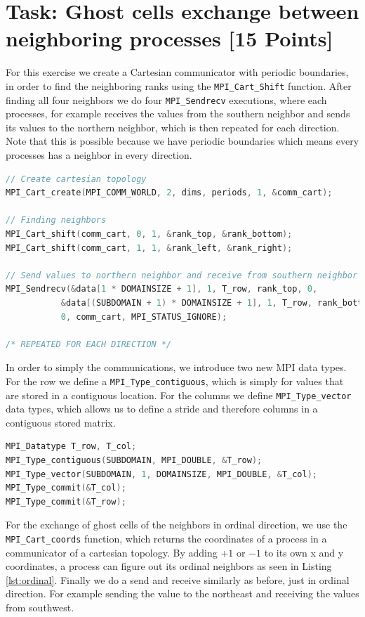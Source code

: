 \section{Task: Ghost cells exchange between neighboring processes [15 Points]}
For this exercise we create a Cartesian communicator with periodic boundaries, in order to find the neighboring ranks using the \texttt{MPI\_Cart\_Shift} function.
After finding all four neighbors we do four \texttt{MPI\_Sendrecv} executions, where each processes, for example receives the values from the southern neighbor and sends its values to the northern neighbor, which is then repeated for each direction. Note that this is possible because we have periodic boundaries which means every processes has a neighbor in every direction.
\begin{lstlisting}[language=C++, caption=Example, label=lst:sendrc]
// Create cartesian topology
MPI_Cart_create(MPI_COMM_WORLD, 2, dims, periods, 1, &comm_cart);

// Finding neighbors
MPI_Cart_shift(comm_cart, 0, 1, &rank_top, &rank_bottom);
MPI_Cart_shift(comm_cart, 1, 1, &rank_left, &rank_right);

// Send values to northern neighbor and receive from southern neighbor
MPI_Sendrecv(&data[1 * DOMAINSIZE + 1], 1, T_row, rank_top, 0,
		   &data[(SUBDOMAIN + 1) * DOMAINSIZE + 1], 1, T_row, rank_bottom,
		   0, comm_cart, MPI_STATUS_IGNORE);

/* REPEATED FOR EACH DIRECTION */
\end{lstlisting}
In order to simply the communications, we introduce two new MPI data types. For the row we define a \texttt{MPI\_Type\_contiguous}, which is simply for values that are stored in a contiguous location. For the columns we define \texttt{MPI\_Type\_vector} data types, which allows us to define a stride and therefore columns in a contiguous stored matrix.
\begin{lstlisting}[language=C++, caption=Example, label=lst:mpi_type]
MPI_Datatype T_row, T_col;
MPI_Type_contiguous(SUBDOMAIN, MPI_DOUBLE, &T_row);
MPI_Type_vector(SUBDOMAIN, 1, DOMAINSIZE, MPI_DOUBLE, &T_col);
MPI_Type_commit(&T_col);
MPI_Type_commit(&T_row);
\end{lstlisting}
For the exchange of ghost cells of the neighbors in ordinal direction, we use the \texttt{MPI\_Cart\_coords} function, which returns the coordinates of a process in a communicator of a cartesian topology. By adding $+1$ or $-1$ to its own x and y coordinates, a process can figure out its ordinal neighbors as seen in Listing \ref{lst:ordinal}. Finally we do a send and receive similarly as before, just in ordinal direction. For example sending the value to the northeast and receiving the values from southwest.
